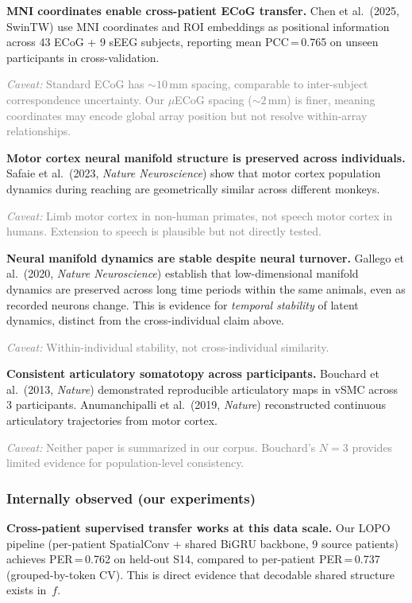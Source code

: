 \documentclass[11pt,letterpaper]{article}
\newcommand{\caveat}[1]{\par\smallskip\noindent\textcolor{gray}{\textit{Caveat:} #1}\smallskip}
\begin{document}
\textbf{MNI coordinates enable cross-patient ECoG transfer.} Chen et al.\ (2025, SwinTW) use MNI coordinates and ROI embeddings as positional information across 43 ECoG + 9 sEEG subjects, reporting mean PCC\,=\,0.765 on unseen participants in cross-validation.

\caveat{Standard ECoG has ${\sim}10$\,mm spacing, comparable to inter-subject correspondence uncertainty. Our $\mu$ECoG spacing (${\sim}2$\,mm) is finer, meaning coordinates may encode global array position but not resolve within-array relationships.}

\textbf{Motor cortex neural manifold structure is preserved across individuals.} Safaie et al.\ (2023, \textit{Nature Neuroscience}) show that motor cortex population dynamics during reaching are geometrically similar across different monkeys.

\caveat{Limb motor cortex in non-human primates, not speech motor cortex in humans. Extension to speech is plausible but not directly tested.}

\textbf{Neural manifold dynamics are stable despite neural turnover.} Gallego et al.\ (2020, \textit{Nature Neuroscience}) establish that low-dimensional manifold dynamics are preserved across long time periods within the same animals, even as recorded neurons change. This is evidence for \emph{temporal stability} of latent dynamics, distinct from the cross-individual claim above.

\caveat{Within-individual stability, not cross-individual similarity.}

\textbf{Consistent articulatory somatotopy across participants.} Bouchard et al.\ (2013, \textit{Nature}) demonstrated reproducible articulatory maps in vSMC across 3 participants. Anumanchipalli et al.\ (2019, \textit{Nature}) reconstructed continuous articulatory trajectories from motor cortex.

\caveat{Neither paper is summarized in our corpus. Bouchard's $N{=}3$ provides limited evidence for population-level consistency.}

\subsubsection{Internally observed (our experiments)}

\textbf{Cross-patient supervised transfer works at this data scale.} Our LOPO pipeline (per-patient SpatialConv + shared BiGRU backbone, 9 source patients) achieves PER\,=\,0.762 on held-out S14, compared to per-patient PER\,=\,0.737 (grouped-by-token CV). This is direct evidence that decodable shared structure exists in~$f$.
\end{document}
